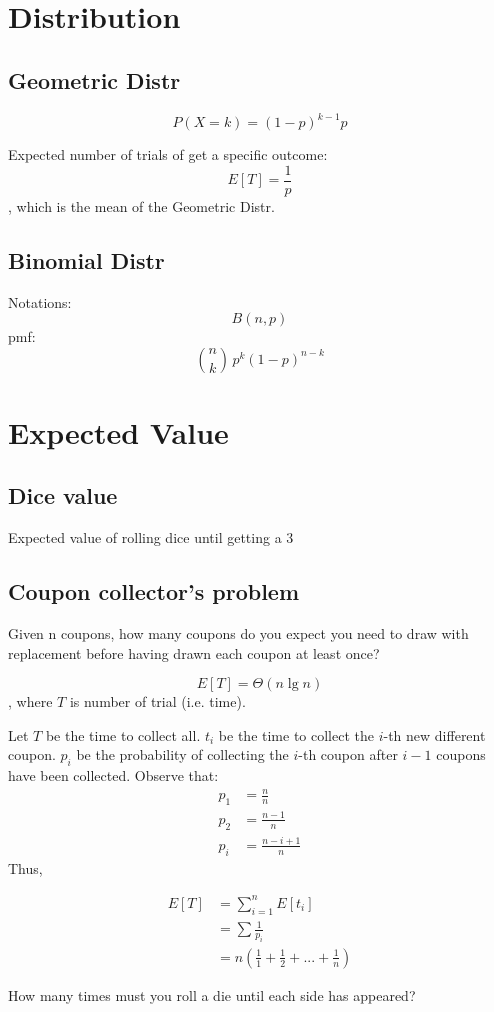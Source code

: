 \section{Distribution}
\subsection{Geometric Distr}
$$
P(X=k) = (1-p)^{k-1}p
$$

Expected number of trials of get a specific outcome:
$$
E[T] = \frac{1}{p}
$$
, which is the mean of the Geometric Distr. 
\subsection{Binomial Distr}
Notations:
$$
B(n, p)
$$
pmf:
$$
{n \choose k}\,p^{k}(1-p)^{n-k}
$$

\section{Expected Value}
\subsection{Dice value}
Expected value of rolling dice until getting a 3
\subsection{Coupon collector's problem}
Given n coupons, how many coupons do you expect you need to draw with replacement before having drawn each coupon at least once?

$$
E[T] = \Theta(n \lg n)
$$
, where $T$ is number of trial (i.e. time).

Let $T$ be the time to collect all. $t_i$ be the time to collect the $i$-th new different coupon. $p_i$ be the probability of collecting the $i$-th coupon after $i-1$ coupons have been collected. Observe that:
\begin{align*}
p_1 &= \frac{n}{n} \\ 
p_2 &= \frac{n-1}{n} \\
p_i &= \frac{n-i+1}{n}
\end{align*}
Thus,

\begin{align*}
E[T] &= \sum_{i=1}^n E[t_i] \\
&= \sum \frac{1}{p_i} \\
&= n(\frac{1}{1}+\frac{1}{2}+...+\frac{1}{n})
\end{align*}

 How many times must you roll a die until each side has appeared?

